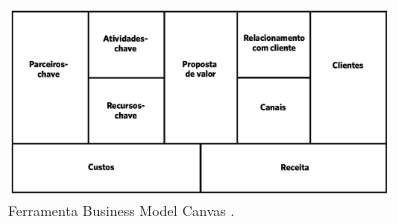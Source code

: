 \begin{figure}[H]
 \centering
  \includegraphics[width=0.90\textwidth]{./fig/estrutura_canvas}
 \caption{Ferramenta Business Model Canvas \cite{bmc2011}.}
 \label{fig:estrutura_canvas}
\end{figure}

